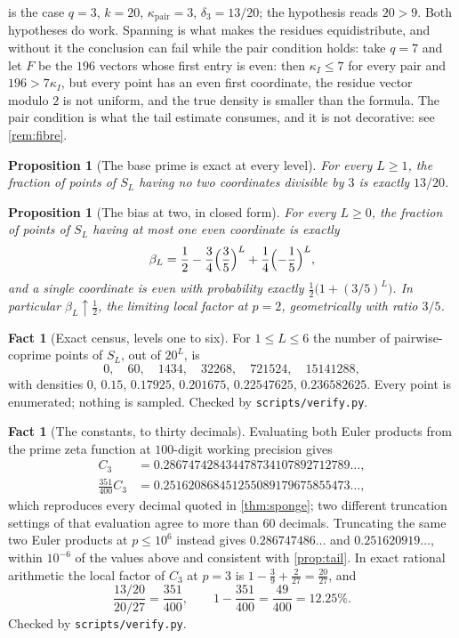 \documentclass[11pt]{amsart}
\newtheorem{proposition}[theorem]{Proposition}
\theoremstyle{definition}
\newtheorem{fact}[theorem]{Fact}
\theoremstyle{remark}
\begin{document}
 is the case $q=3$, $k=20$, $\kappa_{\text{pair}}=3$, $\delta_3=13/20$; the hypothesis reads $20>9$. Both hypotheses do work. Spanning is what makes the residues equidistribute, and without it the conclusion can fail while the pair condition holds: take $q=7$ and let $F$ be the $196$ vectors whose first entry is even: then $\kappa_I\le7$ for every pair and $196>7\kappa_I$, but every point has an even first coordinate, the residue vector modulo $2$ is not uniform, and the true density is smaller than the formula. The pair condition is what the tail estimate consumes, and it is not decorative: see \cref{rem:fibre}.

\begin{proposition}[The base prime is exact at every level]
\label{prop:base}
For every $L\ge1$, the fraction of points of $S_L$ having no two coordinates divisible by $3$ is exactly $13/20$.
\end{proposition}

\begin{proposition}[The bias at two, in closed form]
\label{prop:two}
For every $L\ge0$, the fraction of points of $S_L$ having at most one even coordinate is exactly
\[
\beta_L=\frac12-\frac34\Bigl(\frac35\Bigr)^{L}+\frac14\Bigl(-\frac15\Bigr)^{L},
\]
and a single coordinate is even with probability exactly $\tfrac12\bigl(1+(3/5)^L\bigr)$. In particular $\beta_L\uparrow\tfrac12$, the limiting local factor at $p=2$, geometrically with ratio $3/5$.
\end{proposition}

\begin{fact}[Exact census, levels one to six]
\label{fact:census}
For $1\le L\le6$ the number of pairwise-coprime points of $S_L$, out of $20^L$, is
\[
0,\quad 60,\quad 1434,\quad 32268,\quad 721524,\quad 15141288,
\]
with densities $0$, $0.15$, $0.17925$, $0.201675$, $0.22547625$, $0.236582625$. Every point is enumerated; nothing is sampled. Checked by \texttt{scripts/verify.py}.
\end{fact}

\begin{fact}[The constants, to thirty decimals]
\label{fact:const}
Evaluating both Euler products from the prime zeta function at $100$-digit working precision gives
\[
\begin{aligned}
C_3&=0.286747428434478734107892712789\ldots,\\
\tfrac{351}{400}C_3&=0.251620868451255089179675855473\ldots,
\end{aligned}
\]
which reproduces every decimal quoted in \cref{thm:sponge}; two different truncation settings of that evaluation agree to more than $60$ decimals. Truncating the same two Euler products at $p\le10^6$ instead gives $0.286747486\ldots$ and $0.251620919\ldots$, within $10^{-6}$ of the values above and consistent with \cref{prop:tail}. In exact rational arithmetic the local factor of $C_3$ at $p=3$ is $1-\frac39+\frac2{27}=\frac{20}{27}$, and
\[
\frac{13/20}{20/27}=\frac{351}{400},
\qquad
1-\frac{351}{400}=\frac{49}{400}=12.25\%.
\]
Checked by \texttt{scripts/verify.py}.
\end{fact}
\end{document}
